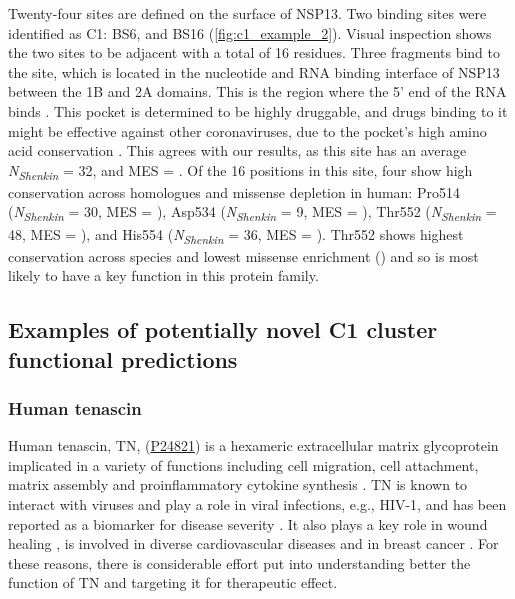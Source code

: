 Twenty-four sites are defined on the surface of NSP13. Two binding sites were identified as C1: BS6, and BS16 (\autoref{fig:c1_example_2}). Visual inspection shows the two sites to be adjacent with a total of 16 residues. Three fragments bind to the site, which is located in the nucleotide and RNA binding interface of NSP13 between the 1B and 2A domains. This is the region where the 5’ end of the RNA binds \cite{YAN_2020_SARSCOV2}. This pocket is determined to be highly druggable, and drugs binding to it might be effective against other coronaviruses, due to the pocket’s high amino acid conservation \cite{NEWMAN_2021_SARSCOV2}. This agrees with our results, as this site has an average \textit{N\textsubscript{Shenkin}} = 32, and MES = . Of the 16 positions in this site, four show high conservation across homologues and missense depletion in human: Pro514 (\textit{N\textsubscript{Shenkin}} = 30, MES = ), Asp534 (\textit{N\textsubscript{Shenkin}} = 9, MES = ), Thr552 (\textit{N\textsubscript{Shenkin}} = 48, MES = ), and His554 (\textit{N\textsubscript{Shenkin}} = 36, MES = ). Thr552 shows highest conservation across species and lowest missense enrichment () and so is most likely to have a key function in this protein family.

\subsection{Examples of potentially novel C1 cluster functional predictions}

\subsubsection{Human tenascin}

Human tenascin, TN, (\href{https://www.uniprot.org/uniprotkb/P24821/entry}{P24821}) is a hexameric extracellular matrix glycoprotein implicated in a variety of functions including cell migration, cell attachment, matrix assembly and proinflammatory cytokine synthesis \cite{BHATTACHARYYA_2022_TNC}. TN is known to interact with viruses and play a role in viral infections, e.g., HIV-1, and has been reported as a biomarker for disease severity \cite{ZULIANI_2023_TNC}. It also plays a key role in wound healing \cite{WANG_2022_TNC}, is involved in diverse cardiovascular diseases \cite{KHOMTCHOUK_2022_TNC} and in breast cancer \cite{LEPUCKI_2022_TNC}. For these reasons, there is considerable effort put into understanding better the function of TN and targeting it for therapeutic effect.

